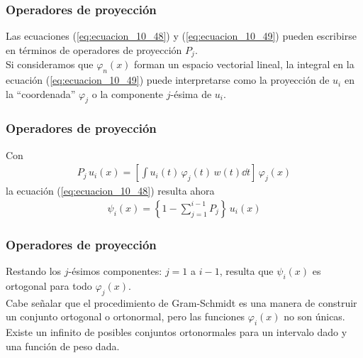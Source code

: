 \begin{frame}
\frametitle{Operadores de proyección}
Las ecuaciones (\ref{eq:ecuacion_10_48}) y (\ref{eq:ecuacion_10_49}) pueden escribirse en términos de operadores de proyección $P_{j}$.
\\
\bigskip
Si consideramos que $\varphi_{n}(x)$ forman un espacio vectorial lineal, la integral en la ecuación (\ref{eq:ecuacion_10_49}) puede interpretarse como la proyección de $u_{i}$ en la \enquote{coordenada} $\varphi_{j}$ o la componente $j$-ésima de $u_{i}$.
\end{frame}
\begin{frame}
\frametitle{Operadores de proyección}
Con
\begin{align*}
P_{j} \, u_{i}(x) = \left[ \int u_{i}(t) \, \varphi_{j}(t) \, w(t) \dd{t} \right]\, \varphi_{j}(x)
\end{align*}
la ecuación (\ref{eq:ecuacion_10_48}) resulta ahora
\begin{align}
\psi_{i}(x) = \left\{ 1 - \sum_{j=1}^{i-1} P_{j} \right\} \, u_{i}(x)
\label{eq:ecuacion_10_48a}
\end{align}
\end{frame}
\begin{frame}
\frametitle{Operadores de proyección}
Restando los $j$-ésimos componentes: $j=1$ a $i-1$, resulta que $\psi_{i}(x)$ es ortogonal para todo $\varphi_{j}(x)$.
\\
\bigskip
\pause
Cabe señalar que el procedimiento de Gram-Schmidt es una manera de construir un conjunto ortogonal o ortonormal, pero las funciones $\varphi_{i}(x)$ no son únicas. Existe un infinito de posibles conjuntos ortonormales para un intervalo dado y una función de peso dada.
\end{frame}
